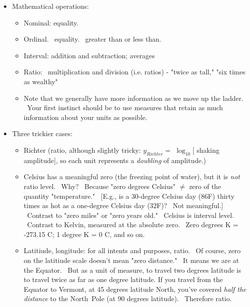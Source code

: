 \documentclass[11pt]{article}
\begin{document}
\begin{itemize}
\item Mathematical operations:

\begin{itemize}
\item Nominal: equality.

\item Ordinal. \ equality. \ greater than or less than.

\item Interval: addition and subtraction; averages

\item Ratio: \ multiplication and division (i.e. ratios) - "twice as tall,"
"six times as wealthy"

\item Note that we generally have more information as we move up the ladder.
\ Your first instinct should be to use measures that retain as much
information about your units as possible.
\end{itemize}

\item Three trickier cases:

\begin{itemize}
\item Richter (ratio, although slightly tricky: $y_{Richter}=$ $\log _{10}[$%
shaking amplitude$]$, so each unit represents a \textit{doubling} of
amplitude.) \ 

\item Celsius has a meaningful zero (the freezing point of water), but it is 
\textit{not} ratio level. \ Why? \ Because "zero degrees Celsius" $\neq $
zero of the quantity "temperature." \ [E.g., is a 30-degree Celsius day
(86F) thirty times as hot as a one-degree Celsius day (32F)? \ Not
meaningful.] \ Contrast to "zero miles" or "zero years old." \ Celsius is
interval level. \ Contrast to Kelvin, measured at the absolute zero. \ Zero
degrees K = -273.15 C; 1 degree K = 0 C, and so on.

\item Latitiude, longitude: for all intents and purposes, ratio. \ Of
course, zero on the latitiude scale doesn't mean "zero distance." \ It means
we are at the Equator. \ But as a unit of measure, to travel two degrees
latitude is to travel twice as far as one degree latitude. If you travel
from the Equator to Vermont, at 45 degrees latitude North, you've covered 
\textit{half the distance} to the North\ Pole (at 90 degrees latitude). \
Therefore ratio.
\end{itemize}


\end{itemize}
\end{document}
